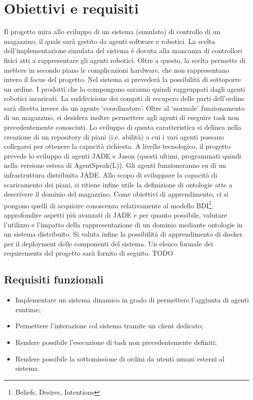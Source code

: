 \section{Obiettivi e requisiti}
Il progetto mira allo sviluppo di un sistema (simulato) di controllo di un magazzino, il quale sarà gestito da agenti software e robotici. La scelta dell’implementazione simulata del sistema è dovuta alla mancanza di controllori fisici atti a rappresentare gli agenti robotici. Oltre a questo, la scelta permette di mettere in secondo piano le complicazioni
hardware, che non rappresentano invero il focus del progetto.
\parag
Nel sistema si prevederà la possibilità di sottoporre un ordine. I prodotti che lo compongono saranno quindi raggruppati dagli agenti robotici incaricati. La suddivisione dei compiti di recupero delle parti dell'ordine sarà diretta invece da un agente `coordinatore'.\newline
Oltre al `normale' funzionamento di un magazzino, si desidera inoltre permettere agli agenti di eseguire task non precedentemente conosciuti. Lo sviluppo di questa caratteristica si delinea nella creazione di un repository di piani (i.e. abilità) a cui i vari agenti possano collegarsi per ottenere la capacità richiesta.
\parag
A livello tecnologico, il progetto prevede lo sviluppo di agenti JADE e Jason (questi ultimi, programmati quindi nella versione estesa di AgentSpeak(L)). Gli agenti funzioneranno su di un infrastruttura distribuita JADE.
Allo scopo di sviluppare la capacità di scaricamento dei piani, si ritiene infine utile la definizione di ontologie atte a descrivere il dominio del magazzino.
\parag
Come obiettivi di apprendimento, ci si pongono quelli di acquisire conoscenza relativamente al modello BDI\footnote{Beliefs, Desires, Intentions}, approfondire aspetti più avanzati di JADE e per quanto
possibile, valutare l'utilizzo e l'impatto della rappresentazione di un dominio mediante ontologie in un sistema distribuito. Si valuta infine la possibilità di apprendimento di docker per il deployment delle componenti del sistema.
\parag
Un elenco formale dei requirements del progetto sarà fornito di seguito. TODO

\subsection{Requisiti funzionali}
\begin{itemize}
    \item Implementare un sistema dinamico in grado di permettere l'aggiunta di agenti runtime;
    \item Permettere l'interazione col sistema tramite un client dedicato;
    \item Rendere possibile l'esecuzione di task non precedentemente definiti;
    \item Rendere possibile la sottomissione di ordini da utenti umani esterni al sistema.
\end{itemize}

